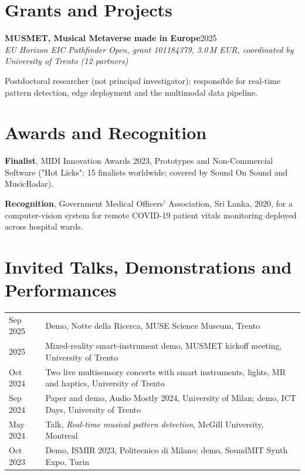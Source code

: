 \documentclass[11pt]{article}
\newcommand{\entry}[3]{%
  \par\noindent\textbf{#1}\hfill #2\\
  \noindent\textit{#3}\par\vspace{0.15em}}
\begin{document}
\section*{Grants and Projects}
\entry{MUSMET, Musical Metaverse made in Europe}{2025}{EU Horizon EIC Pathfinder Open, grant 101184379, 3.0\,M EUR, coordinated by University of Trento (12 partners)}
\begin{cvlist}
  \item Postdoctoral researcher (not principal investigator); responsible for real-time pattern detection, edge deployment and the multimodal data pipeline.
\end{cvlist}

\section*{Awards and Recognition}
\begin{cvlist}
  \item \textbf{Finalist}, MIDI Innovation Awards 2023, Prototypes and Non-Commercial Software ("Hot Licks"; 15 finalists worldwide; covered by Sound On Sound and MusicRadar).
  \item \textbf{Recognition}, Government Medical Officers' Association, Sri Lanka, 2020, for a computer-vision system for remote COVID-19 patient vitals monitoring deployed across hospital wards.
\end{cvlist}

\section*{Invited Talks, Demonstrations and Performances}
\begin{tabularx}{\linewidth}{@{}l X@{}}
  Sep 2025 & Demo, Notte della Ricerca, MUSE Science Museum, Trento \\
  2025 & Mixed-reality smart-instrument demo, MUSMET kickoff meeting, University of Trento \\
  Oct 2024 & Two live multisensory concerts with smart instruments, lights, MR and haptics, University of Trento \\
  Sep 2024 & Paper and demo, Audio Mostly 2024, University of Milan; demo, ICT Days, University of Trento \\
  May 2024 & Talk, \textit{Real-time musical pattern detection}, McGill University, Montreal \\
  Oct 2023 & Demo, ISMIR 2023, Politecnico di Milano; demo, SoundMIT Synth Expo, Turin \\
\end{tabularx}
\end{document}
